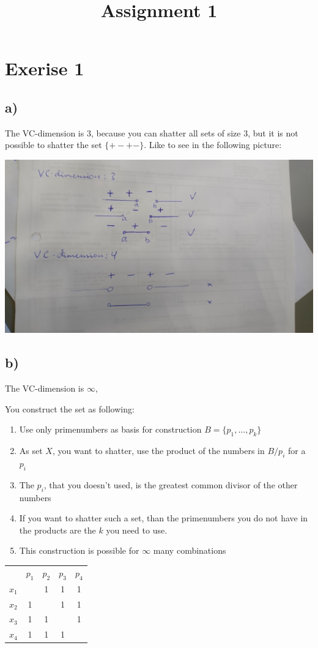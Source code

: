 \documentclass{article}
\title{Assignment 1}
\begin{document}
\section*{Exerise 1}
\subsection*{a)}
The VC-dimension is 3, because you can shatter all sets of size 3, but it is not
possible to shatter the set $\{+-+-\}$. Like to see in the following picture:

\includegraphics[width=.6\linewidth]{1a.jpg}

\subsection*{b)}

The VC-dimension is $\infty$, 

You construct the set as following:
\begin{enumerate}
  \item Use only primenumbers as basis for construction $B=\{p_1,\ldots,p_k\}$
  \item As set $X$, you want to shatter, use the product of the numbers in
  $B/p_i$ for a $p_i$
  \item The $p_i$, that you doesn't used, is the greatest common divisor of the
  other numbers
  \item If you want to shatter such a set, than the primenumbers you do not have
  in the products are the $k$ you need to use.
  \item This construction is possible for $\infty$ many combinations
\end{enumerate}
\begin{tabular}{|c|c|c|c|c|}
	  &$p_1$ &$p_2$ &$p_3$ &$p_4$\\
$x_1$ &		 &1		&1	   &1\\
$x_2$ &1	 &		&1	   &1\\
$x_3$ &1	 &1		&	   &1\\
$x_4$ &1	 &1		&1	   & \\
\end{tabular}
\end{document}
